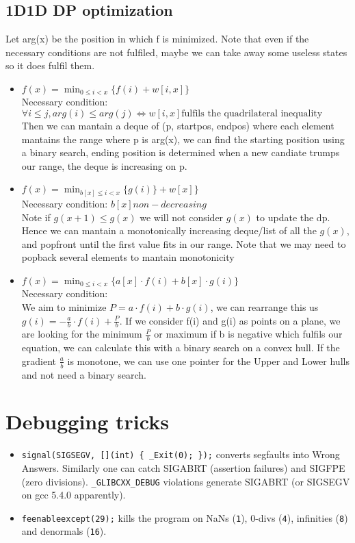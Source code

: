 \subsection{1D1D DP optimization}
Let arg(x) be the position in which f is minimized. Note that even if the
necessary conditions are not fulfiled, maybe we can take away some useless states so
it does fulfil them.
\begin{itemize}
\item \(f(x) = \min_{0 \leq i < x} \{ f(i) + w[i,x] \} \) \\
  Necessary condition: \( \forall i \leq j, arg(i) \leq arg(j) \iff w[i,x] \text{
    fulfils the quadrilateral inequality}\) \\
  Then we can mantain a deque of (p, startpos, endpos) where each element
  mantains the range where p is arg(x), we can find the starting position
  using a binary search, ending position is determined when a new candiate
  trumps our range, the deque is increasing on p.
\item \( f(x) = \min_{b[x] \leq i < x} \{g(i)\} + w[x]\} \) \\
  Necessary condition: \(b[x] non-decreasing\) \\
  Note if \( g(x+1) \leq g(x) \) we will not consider \(g(x)\) to update the
  dp. Hence we can mantain a monotonically increasing deque/list of all the
  \(g(x)\), and popfront until the first value fits in our range. Note that we
  may need to popback several elements to mantain monotonicity
\item \( f(x) = \min_{0 \leq i < x} \{a[x]\cdot f(i) + b[x]\cdot g(i)\} \) \\
  Necessary condition: \\
  We aim to minimize \( P = a\cdot f(i) + b\cdot g(i) \), we can rearrange
  this us \(g(i) = -\frac{a}{b}\cdot f(i) + \frac{P}{b}\). If we consider f(i)
  and g(i) as points on a plane, we are looking for the minimum \(\frac{P}{b}
  \) or maximum if b is negative which fulfils our equation, we can calculate
  this with a binary search on a convex hull. If the gradient \( \frac{a}{b}
  \) is monotone, we can use one pointer for the Upper and Lower hulls and not need a binary search.
\end{itemize}

\section{Debugging tricks}
\begin{itemize}
\item \texttt{signal(SIGSEGV, [](int) \{ \_Exit(0); \});} converts segfaults into Wrong Answers.
  Similarly one can catch SIGABRT (assertion failures) and SIGFPE (zero divisions).
  \texttt{\_GLIBCXX\_DEBUG} violations generate SIGABRT (or SIGSEGV on gcc 5.4.0 apparently).
\item \texttt{feenableexcept(29);} kills the program on NaNs (\texttt 1), 0-divs (\texttt 4), infinities (\texttt 8) and denormals (\texttt{16}).
\end{itemize}

